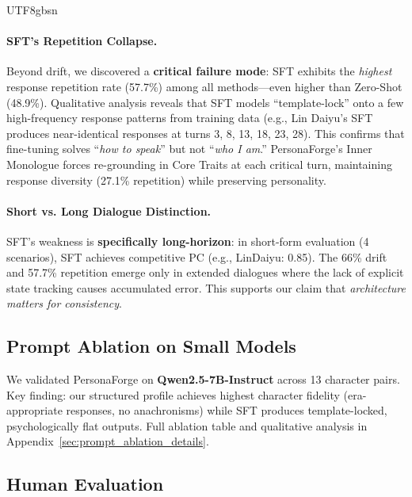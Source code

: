 \documentclass[11pt]{article}
\begin{document}
\begin{CJK*}{UTF8}{gbsn}
\paragraph{SFT's Repetition Collapse.} Beyond drift, we discovered a \textbf{critical failure mode}: SFT exhibits the \textit{highest} response repetition rate (57.7\%) among all methods---even higher than Zero-Shot (48.9\%). Qualitative analysis reveals that SFT models ``template-lock'' onto a few high-frequency response patterns from training data (e.g., Lin Daiyu's SFT produces near-identical responses at turns 3, 8, 13, 18, 23, 28). This confirms that fine-tuning solves ``\textit{how to speak}'' but not ``\textit{who I am}.'' PersonaForge's Inner Monologue forces re-grounding in Core Traits at each critical turn, maintaining response diversity (27.1\% repetition) while preserving personality.

\paragraph{Short vs. Long Dialogue Distinction.} SFT's weakness is \textbf{specifically long-horizon}: in short-form evaluation (4 scenarios), SFT achieves competitive PC (e.g., LinDaiyu: 0.85). The 66\% drift and 57.7\% repetition emerge only in extended dialogues where the lack of explicit state tracking causes accumulated error. This supports our claim that \textit{architecture matters for consistency}.

\subsection{Prompt Ablation on Small Models}
\label{sec:prompt_ablation}

We validated PersonaForge on \textbf{Qwen2.5-7B-Instruct} across 13 character pairs. Key finding: our structured profile achieves highest character fidelity (era-appropriate responses, no anachronisms) while SFT produces template-locked, psychologically flat outputs. Full ablation table and qualitative analysis in Appendix~\ref{sec:prompt_ablation_details}.

\subsection{Human Evaluation}
\label{sec:human_eval}


\end{CJK*}
\end{document}
